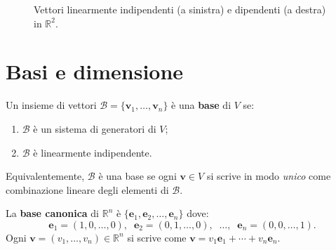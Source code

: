 \begin{figure}[htbp]
\centering
{}
\caption{Vettori linearmente indipendenti (a sinistra) e dipendenti (a destra) in $\mathbb{R}^2$.}
\label{fig:indipendenza}
\end{figure}

\section{Basi e dimensione}
\label{sec:basi-dimensione}

\begin{definitionbox}[Base]
Un insieme di vettori $\mathcal{B} = \{\mathbf{v}_1, \ldots, \mathbf{v}_n\}$ è una \textbf{base} di $V$ se:
\begin{enumerate}
    \item $\mathcal{B}$ è un sistema di generatori di $V$;
    \item $\mathcal{B}$ è linearmente indipendente.
\end{enumerate}
Equivalentemente, $\mathcal{B}$ è una base se ogni $\mathbf{v} \in V$ si scrive in modo \emph{unico} come combinazione lineare degli elementi di $\mathcal{B}$.
\end{definitionbox}

\begin{examplebox}
La \textbf{base canonica} di $\mathbb{R}^n$ è $\{\mathbf{e}_1, \mathbf{e}_2, \ldots, \mathbf{e}_n\}$ dove:
\[ \mathbf{e}_1 = (1,0,\ldots,0), \;\; \mathbf{e}_2 = (0,1,\ldots,0), \;\; \ldots, \;\; \mathbf{e}_n = (0,0,\ldots,1). \]
Ogni $\mathbf{v} = (v_1, \ldots, v_n) \in \mathbb{R}^n$ si scrive come $\mathbf{v} = v_1\mathbf{e}_1 + \cdots + v_n\mathbf{e}_n$.
\end{examplebox}

